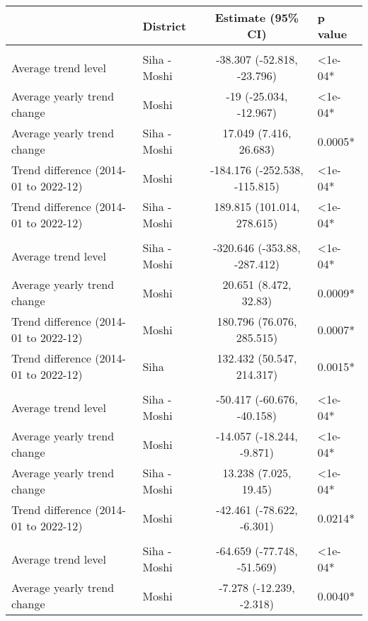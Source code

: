\begingroup
\fontsize{12.0pt}{14.4pt}\selectfont
\begin{longtable}{l|lcl}
\toprule
 & District & Estimate (95\% CI) & p value \\ 
\midrule\addlinespace[2.5pt]
\multicolumn{4}{l}{Chronic Respiratory Disease} \\[2.5pt] 
\midrule\addlinespace[2.5pt]
Average trend level & Siha - Moshi & -38.307 (-52.818, -23.796) & <1e-04* \\ 
Average yearly trend change & Moshi & -19 (-25.034, -12.967) & <1e-04* \\ 
Average yearly trend change & Siha - Moshi & 17.049 (7.416, 26.683) & 0.0005* \\ 
Trend difference (2014-01 to 2022-12) & Moshi & -184.176 (-252.538, -115.815) & <1e-04* \\ 
Trend difference (2014-01 to 2022-12) & Siha - Moshi & 189.815 (101.014, 278.615) & <1e-04* \\ 
\midrule\addlinespace[2.5pt]
\multicolumn{4}{l}{Diabetes Mellitus} \\[2.5pt] 
\midrule\addlinespace[2.5pt]
Average trend level & Siha - Moshi & -320.646 (-353.88, -287.412) & <1e-04* \\ 
Average yearly trend change & Moshi & 20.651 (8.472, 32.83) & 0.0009* \\ 
Trend difference (2014-01 to 2022-12) & Moshi & 180.796 (76.076, 285.515) & 0.0007* \\ 
Trend difference (2014-01 to 2022-12) & Siha & 132.432 (50.547, 214.317) & 0.0015* \\ 
\midrule\addlinespace[2.5pt]
\multicolumn{4}{l}{Epilepsy} \\[2.5pt] 
\midrule\addlinespace[2.5pt]
Average trend level & Siha - Moshi & -50.417 (-60.676, -40.158) & <1e-04* \\ 
Average yearly trend change & Moshi & -14.057 (-18.244, -9.871) & <1e-04* \\ 
Average yearly trend change & Siha - Moshi & 13.238 (7.025, 19.45) & <1e-04* \\ 
Trend difference (2014-01 to 2022-12) & Moshi & -42.461 (-78.622, -6.301) & 0.0214* \\ 
\midrule\addlinespace[2.5pt]
\multicolumn{4}{l}{Fractures} \\[2.5pt] 
\midrule\addlinespace[2.5pt]
Average trend level & Siha - Moshi & -64.659 (-77.748, -51.569) & <1e-04* \\ 
Average yearly trend change & Moshi & -7.278 (-12.239, -2.318) & 0.0040* \\ 

\end{longtable}
